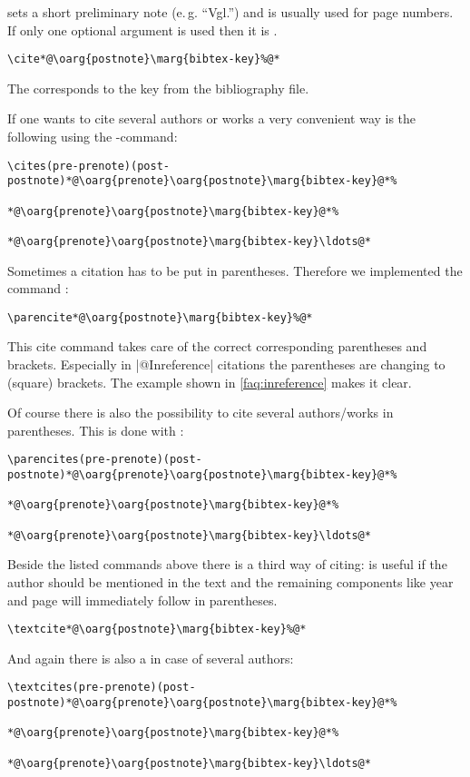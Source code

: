 \documentclass[a4paper,
10pt,
greek,
french,
spanish,
italian,
ngerman,
english
]{ltxdoc}
\begin{document}
 sets a short preliminary note (e.\,g. \enquote{Vgl.}) and  is usually used for page numbers.
If only one optional argument is used then it is .
\begin{lstlisting}
\cite*@\oarg{postnote}\marg{bibtex-key}%@*
\end{lstlisting}
The  corresponds to the key from the bibliography file.

\DescribeMacro{\cites}
If one wants to cite several authors or works a very convenient way is the following using the -command:
\begin{lstlisting}
\cites(pre-prenote)(post-postnote)*@\oarg{prenote}\oarg{postnote}\marg{bibtex-key}@*%
 																	*@\oarg{prenote}\oarg{postnote}\marg{bibtex-key}@*%
 																	*@\oarg{prenote}\oarg{postnote}\marg{bibtex-key}\ldots@*
\end{lstlisting}
 
\DescribeMacro{\parencite}
Sometimes a citation has to be put in parentheses. 
Therefore we implemented the command :
\begin{lstlisting}
\parencite*@\oarg{postnote}\marg{bibtex-key}%@*
\end{lstlisting} 
This cite command takes care of the correct corresponding parentheses and brackets.
Especially in |@Inreference| citations the parentheses are changing to (square) brackets.
The example shown in \cref{faq:inreference} makes it clear.

\DescribeMacro{\parencites}
Of course there is also the possibility to cite several authors/works in parentheses.
This is done with :
\begin{lstlisting}
\parencites(pre-prenote)(post-postnote)*@\oarg{prenote}\oarg{postnote}\marg{bibtex-key}@*%
 																			*@\oarg{prenote}\oarg{postnote}\marg{bibtex-key}@*%
 																			*@\oarg{prenote}\oarg{postnote}\marg{bibtex-key}\ldots@*
\end{lstlisting}
 
\DescribeMacro{\textcite}
Beside the listed  commands above there is a third way of citing:
 is useful if the author should be mentioned in the text and the remaining components like year and page will immediately follow in parentheses. 
\begin{lstlisting}
\textcite*@\oarg{postnote}\marg{bibtex-key}%@*
\end{lstlisting} 

\DescribeMacro{\textcites}
And again there is also a  in case of several authors: 
  \begin{lstlisting}
\textcites(pre-prenote)(post-postnote)*@\oarg{prenote}\oarg{postnote}\marg{bibtex-key}@*%
 																			*@\oarg{prenote}\oarg{postnote}\marg{bibtex-key}@*%
 																			*@\oarg{prenote}\oarg{postnote}\marg{bibtex-key}\ldots@*
\end{lstlisting}
\end{document}
